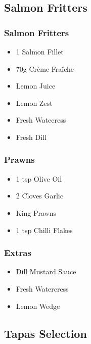 \documentclass[11pt, english]{article}
\begin{document}
\newpage

	\subsection{Salmon Fritters}

		\subsubsection*{Salmon Fritters}

	\begin{itemize}
        \setlength\itemsep{0cm}
                \item 1 Salmon Fillet
		\item 70g Cr\`{e}me Fra\^{i}che
		\item Lemon Juice
		\item Lemon Zest
		\item Fresh Watecress
		\item Fresh Dill
        \end{itemize}

		\subsubsection*{Prawns}

	\begin{itemize}
        \setlength\itemsep{0cm}
                \item 1 tsp Olive Oil
		\item 2 Cloves Garlic
		\item King Prawns
		\item 1 tsp Chilli Flakes
        \end{itemize}

		\subsubsection*{Extras}

	\begin{itemize}
        \setlength\itemsep{0cm}
                \item Dill Mustard Sauce
		\item Fresh Watercress
		\item Lemon Wedge
        \end{itemize}

\newpage

	\subsection{Tapas Selection}
\end{document}
